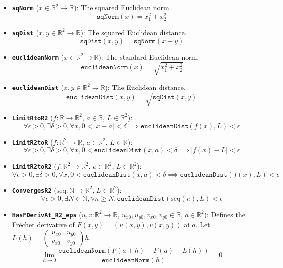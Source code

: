 \documentclass[11pt]{article}
\begin{document}
\begin{itemize}
    \item \textbf{\texttt{sqNorm}} ($x \in \mathbb{R}^2 \to \mathbb{R}$): The squared Euclidean norm.
    \[ \texttt{sqNorm}(x) = x_1^2 + x_2^2 \]
    
    \item \textbf{\texttt{sqDist}} ($x, y \in \mathbb{R}^2 \to \mathbb{R}$): The squared Euclidean distance.
    \[ \texttt{sqDist}(x, y) = \texttt{sqNorm}(x - y) \]
    
    \item \textbf{\texttt{euclideanNorm}} ($x \in \mathbb{R}^2 \to \mathbb{R}$): The standard Euclidean norm.
    \[ \texttt{euclideanNorm}(x) = \sqrt{x_1^2 + x_2^2} \]
    
    \item \textbf{\texttt{euclideanDist}} ($x, y \in \mathbb{R}^2 \to \mathbb{R}$): The Euclidean distance.
    \[ \texttt{euclideanDist}(x, y) = \sqrt{\texttt{sqDist}(x, y)} \]
    
    \item \textbf{\texttt{LimitRtoR2}} ($f : \mathbb{R} \to \mathbb{R}^2$, $a \in \mathbb{R}$, $L \in \mathbb{R}^2$):
    \[ \forall \epsilon > 0, \exists \delta > 0, \forall x, 0 < |x - a| < \delta \implies \texttt{euclideanDist}(f(x), L) < \epsilon \]
    
    \item \textbf{\texttt{LimitR2toR}} ($f : \mathbb{R}^2 \to \mathbb{R}$, $a \in \mathbb{R}^2$, $L \in \mathbb{R}$):
    \[ \forall \epsilon > 0, \exists \delta > 0, \forall x, 0 < \texttt{euclideanDist}(x, a) < \delta \implies |f(x) - L| < \epsilon \]
    
    \item \textbf{\texttt{LimitR2toR2}} ($f : \mathbb{R}^2 \to \mathbb{R}^2$, $a \in \mathbb{R}^2$, $L \in \mathbb{R}^2$):
    \[ \forall \epsilon > 0, \exists \delta > 0, \forall x, 0 < \texttt{euclideanDist}(x, a) < \delta \implies \texttt{euclideanDist}(f(x), L) < \epsilon \]
    
    \item \textbf{\texttt{ConvergesR2}} ($\text{seq} : \mathbb{N} \to \mathbb{R}^2$, $L \in \mathbb{R}^2$):
    \[ \forall \epsilon > 0, \exists N \in \mathbb{N}, \forall n \ge N, \texttt{euclideanDist}(\text{seq}(n), L) < \epsilon \]
    
    \item \textbf{\texttt{HasFDerivAt\_R2\_eps}} ($u, v : \mathbb{R}^2 \to \mathbb{R}$, $u_{x0}, u_{y0}, v_{x0}, v_{y0} \in \mathbb{R}$, $a \in \mathbb{R}^2$): Defines the Fréchet derivative of $F(x,y) = (u(x,y), v(x,y))$ at $a$. Let $L(h) = \begin{pmatrix} u_{x0} & u_{y0} \\ v_{x0} & v_{y0} \end{pmatrix} h$.
    \[ \lim_{h \to 0} \frac{\texttt{euclideanNorm}(F(a+h) - F(a) - L(h))}{\texttt{euclideanNorm}(h)} = 0 \]
    

\end{itemize}
\end{document}
